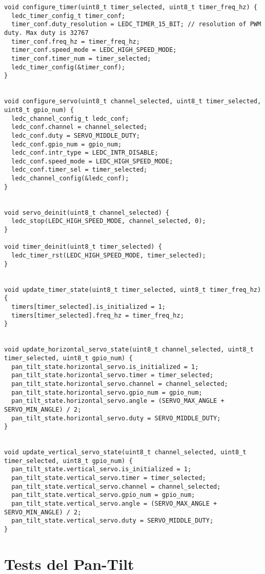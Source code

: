 \begin{lstlisting}
void configure_timer(uint8_t timer_selected, uint8_t timer_freq_hz) {
  ledc_timer_config_t timer_conf;
  timer_conf.duty_resolution = LEDC_TIMER_15_BIT; // resolution of PWM duty. Max duty is 32767
  timer_conf.freq_hz = timer_freq_hz;
  timer_conf.speed_mode = LEDC_HIGH_SPEED_MODE;
  timer_conf.timer_num = timer_selected;
  ledc_timer_config(&timer_conf);
}


void configure_servo(uint8_t channel_selected, uint8_t timer_selected, uint8_t gpio_num) {
  ledc_channel_config_t ledc_conf;
  ledc_conf.channel = channel_selected;
  ledc_conf.duty = SERVO_MIDDLE_DUTY;
  ledc_conf.gpio_num = gpio_num;
  ledc_conf.intr_type = LEDC_INTR_DISABLE;
  ledc_conf.speed_mode = LEDC_HIGH_SPEED_MODE;
  ledc_conf.timer_sel = timer_selected;
  ledc_channel_config(&ledc_conf);
}


void servo_deinit(uint8_t channel_selected) {
  ledc_stop(LEDC_HIGH_SPEED_MODE, channel_selected, 0);
}

void timer_deinit(uint8_t timer_selected) {
  ledc_timer_rst(LEDC_HIGH_SPEED_MODE, timer_selected);
}


void update_timer_state(uint8_t timer_selected, uint8_t timer_freq_hz) {
  timers[timer_selected].is_initialized = 1;
  timers[timer_selected].freq_hz = timer_freq_hz;
}


void update_horizontal_servo_state(uint8_t channel_selected, uint8_t timer_selected, uint8_t gpio_num) {
  pan_tilt_state.horizontal_servo.is_initialized = 1;
  pan_tilt_state.horizontal_servo.timer = timer_selected;
  pan_tilt_state.horizontal_servo.channel = channel_selected;
  pan_tilt_state.horizontal_servo.gpio_num = gpio_num;
  pan_tilt_state.horizontal_servo.angle = (SERVO_MAX_ANGLE + SERVO_MIN_ANGLE) / 2;
  pan_tilt_state.horizontal_servo.duty = SERVO_MIDDLE_DUTY;
}


void update_vertical_servo_state(uint8_t channel_selected, uint8_t timer_selected, uint8_t gpio_num) {
  pan_tilt_state.vertical_servo.is_initialized = 1;
  pan_tilt_state.vertical_servo.timer = timer_selected;
  pan_tilt_state.vertical_servo.channel = channel_selected;
  pan_tilt_state.vertical_servo.gpio_num = gpio_num;
  pan_tilt_state.vertical_servo.angle = (SERVO_MAX_ANGLE + SERVO_MIN_ANGLE) / 2;
  pan_tilt_state.vertical_servo.duty = SERVO_MIDDLE_DUTY;
}
\end{lstlisting}

\section{Tests del Pan-Tilt}
\label{appendix:pantilttests}

